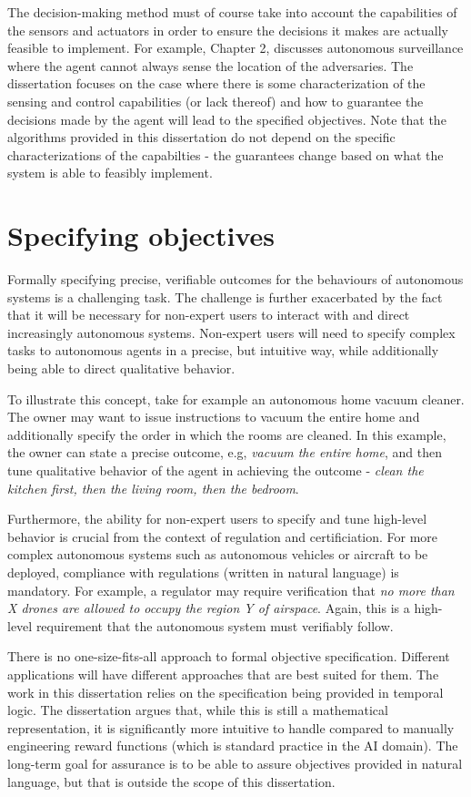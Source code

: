 The decision-making method must of course take into account the capabilities of the sensors and actuators in order to ensure the decisions it makes are actually feasible to implement. For example, Chapter 2, discusses autonomous surveillance where the agent cannot always sense the location of the adversaries. The dissertation focuses on the case where there is some characterization of the sensing and control capabilities (or lack thereof) and how to guarantee the decisions made by the agent will lead to the specified objectives. Note that the algorithms provided in this dissertation do not depend on the specific characterizations of the capabilties - the guarantees change based on what the system is able to feasibly implement. 

\section{Specifying objectives}

Formally specifying precise, verifiable outcomes for the behaviours of autonomous systems is a challenging task. The challenge is further exacerbated by the fact that it will be necessary for non-expert users to interact with and direct increasingly autonomous systems. Non-expert users will need to specify complex tasks to autonomous agents in a precise, but intuitive way, while additionally being able to direct qualitative behavior. 

To illustrate this concept, take for example an autonomous home vacuum cleaner. The owner may want to issue instructions to vacuum the entire home and additionally specify the order in which the rooms are cleaned. In this example, the owner can state a precise outcome, e.g, \emph{vacuum the entire home}, and then tune qualitative behavior of the agent in achieving the outcome - \emph{clean the kitchen first, then the living room, then the bedroom}. 

Furthermore, the ability for non-expert users to specify and tune high-level behavior is crucial from the context of regulation and certificiation. For more complex autonomous systems such as autonomous vehicles or aircraft to be deployed, compliance with regulations (written in natural language) is mandatory. For example, a regulator may require verification that \emph{no more than X drones are allowed to occupy the region Y of airspace}. Again, this is a high-level requirement that the autonomous system must verifiably follow. 

There is no one-size-fits-all approach to formal objective specification. Different applications will have different approaches that are best suited for them. The work in this dissertation relies on the specification being provided in temporal logic. The dissertation argues that, while this is still a mathematical representation, it is significantly more intuitive to handle compared to manually engineering reward functions (which is standard practice in the AI domain). The long-term goal for assurance is to be able to assure objectives provided in natural language, but that is outside the scope of this dissertation. 


